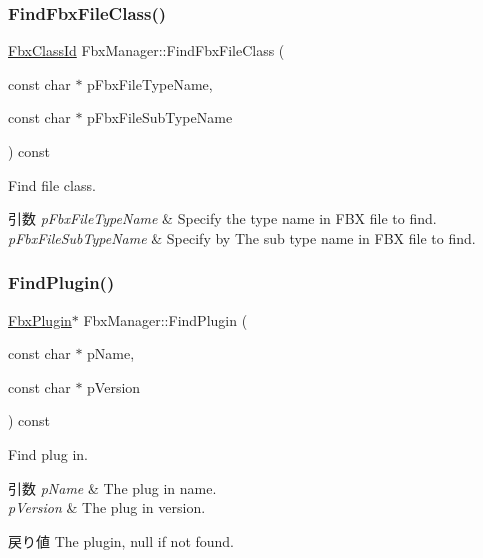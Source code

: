 \subsubsection{\texorpdfstring{Find\+Fbx\+File\+Class()}{FindFbxFileClass()}}
{\footnotesize\ttfamily \hyperlink{class_fbx_class_id}{Fbx\+Class\+Id} Fbx\+Manager\+::\+Find\+Fbx\+File\+Class (\begin{DoxyParamCaption}\item[{const char $\ast$}]{p\+Fbx\+File\+Type\+Name,  }\item[{const char $\ast$}]{p\+Fbx\+File\+Sub\+Type\+Name }\end{DoxyParamCaption}) const}

Find file class. 
\begin{DoxyParams}{引数}
{\em p\+Fbx\+File\+Type\+Name} & Specify the type name in F\+BX file to find. \\
\hline
{\em p\+Fbx\+File\+Sub\+Type\+Name} & Specify by The sub type name in F\+BX file to find. \\
\hline
\end{DoxyParams}
\mbox{\label{class_fbx_manager_accc3ab301611096bdce88b9fd6b9cb57}} 
\subsubsection{\texorpdfstring{Find\+Plugin()}{FindPlugin()}}
{\footnotesize\ttfamily \hyperlink{class_fbx_plugin}{Fbx\+Plugin}$\ast$ Fbx\+Manager\+::\+Find\+Plugin (\begin{DoxyParamCaption}\item[{const char $\ast$}]{p\+Name,  }\item[{const char $\ast$}]{p\+Version }\end{DoxyParamCaption}) const}

Find plug in. 
\begin{DoxyParams}{引数}
{\em p\+Name} & The plug in name. \\
\hline
{\em p\+Version} & The plug in version. \\
\hline
\end{DoxyParams}
\begin{DoxyReturn}{戻り値}
The plugin, {\ttfamily null} if not found. 
\end{DoxyReturn}
\mbox{\label{class_fbx_manager_acf3fa4db57a5c7cb0134179aa1885309}} 
